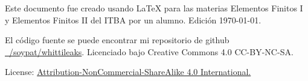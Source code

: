


 


\tableofcontents
\vspace{1cm}
Este documento fue creado usando \LaTeX{} para las materias Elementos Finitos I y Elementos Finitos II del ITBA por un alumno. Edición \today.

El código fuente se puede encontrar mi repositorio de github \href{https://github.com/soypat/whittileaks}{~/soypat/whittileaks}. Licenciado bajo Creative Commons 4.0 CC-BY-NC-SA.

License: \href{https://creativecommons.org/licenses/by-nc-sa/4.0/}{Attribution-NonCommercial-ShareAlike 4.0 International.} 

\clearpage

\pagestyle{plain}









\clearpage

